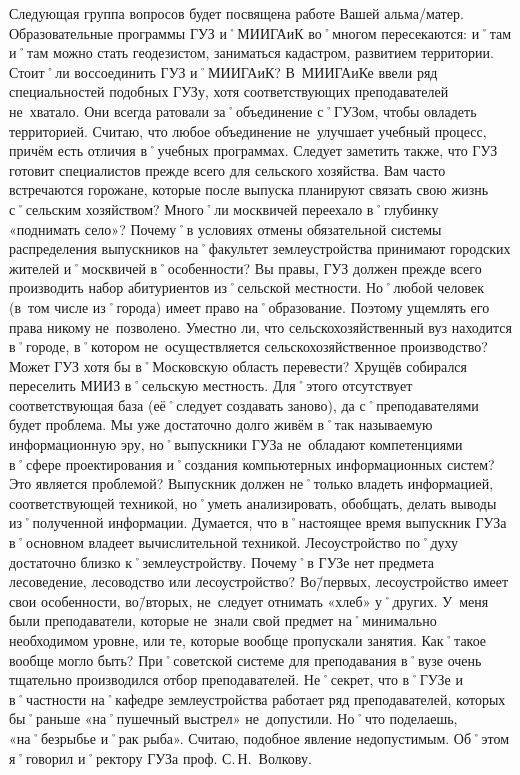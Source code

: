 \begin{drama}
	\maxspeaks Следующая группа вопросов будет посвящена работе Вашей альма\-/матер. Образовательные программы ГУЗ и˚МИИГАиК во˚многом пересекаются: и˚там и˚там можно стать геодезистом, заниматься кадастром, развитием территории. Стоит˚ли воссоединить ГУЗ и˚МИИГАиК? 
	\michaelspeaks В~МИИГАиКе ввели ряд специальностей подобных ГУЗу, хотя соответствующих преподавателей не~хватало. Они всегда ратовали за˚объединение с˚ГУЗом, чтобы овладеть территорией. Считаю, что любое объединение не~улучшает учебный процесс, причём есть отличия в˚учебных программах. Следует заметить также, что ГУЗ готовит специалистов прежде всего для сельского хозяйства.
	\maxspeaks Вам часто встречаются горожане, которые после выпуска планируют связать свою жизнь с˚сельским хозяйством? Много˚ли москвичей переехало в˚глубинку  «поднимать село»? Почему˚в условиях отмены обязательной системы распределения выпускников на˚факультет землеустройства принимают городских жителей и˚москвичей в˚особенности? 
	\michaelspeaks Вы правы, ГУЗ должен прежде всего производить набор абитуриентов из˚сельской местности. Но˚любой человек (в~том числе из˚города) имеет право на˚образование. Поэтому ущемлять его права никому не~позволено. 
	\maxspeaks Уместно ли, что сельскохозяйственный вуз находится в˚городе, в˚котором не~осуществляется сельскохозяйственное производство? Может ГУЗ хотя бы в˚Московскую область перевести?
	\michaelspeaks Хрущёв собирался переселить МИИЗ в˚сельскую местность. Для˚этого отсутствует соответствующая база (её˚следует создавать заново), да с˚преподавателями будет проблема.
	\maxspeaks Мы уже достаточно долго живём в˚так называемую информационную эру, но˚выпускники ГУЗа не~обладают компетенциями в˚сфере проектирования и˚создания компьютерных информационных систем? Это является проблемой?
	\michaelspeaks Выпускник должен не˚только владеть информацией, соответствующей техникой, но˚уметь анализировать, обобщать, делать выводы из˚полученной информации. Думается, что в˚настоящее время выпускник ГУЗа в˚основном владеет вычислительной техникой.
	\maxspeaks Лесоустройство по˚духу достаточно близко к˚землеустройству. Почему˚в ГУЗе нет предмета лесоведение, лесоводство или лесоустройство?
	\michaelspeaks Во\=/первых, лесоустройство имеет свои особенности, во\=/вторых, не~следует отнимать «хлеб» у˚других.
	\maxspeaks У~меня были преподаватели, которые не~знали свой предмет на˚минимально необходимом уровне, или те, которые вообще пропускали занятия. Как˚такое вообще могло быть? 
	\michaelspeaks При˚советской системе для преподавания в˚вузе очень тщательно производился отбор преподавателей. Не˚секрет, что в˚ГУЗе и в˚частности на˚кафедре землеустройства работает ряд преподавателей, которых бы˚раньше «на˚пушечный выстрел» не~допустили. Но˚что поделаешь, «на˚безрыбье и˚рак рыба». Считаю, подобное явление недопустимым. Об˚этом я˚говорил и˚ректору ГУЗа проф. С.\,Н.~Волкову.

\end{drama}
